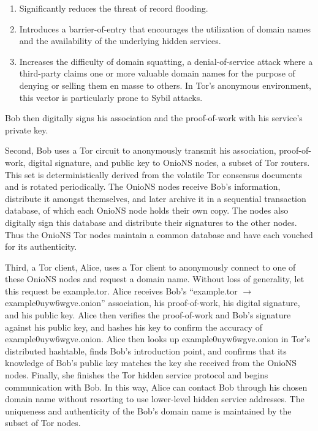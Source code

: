 \documentclass{sig-alternate}
\begin{document}
\begin{enumerate}
	\item Significantly reduces the threat of record flooding.
	\item Introduces a barrier-of-entry that encourages the utilization of domain names and the availability of the underlying hidden services.
	\item Increases the difficulty of domain squatting, a denial-of-service attack where a third-party claims one or more valuable domain names for the purpose of denying or selling them en masse to others. In Tor's anonymous environment, this vector is particularly prone to Sybil attacks.
\end{enumerate}

Bob then digitally signs his association and the proof-of-work with his service's private key.

Second, Bob uses a Tor circuit to anonymously transmit his association, proof-of-work, digital signature, and public key to OnioNS nodes, a subset of Tor routers. This set is deterministically derived from the volatile Tor consensus documents and is rotated periodically. The OnioNS nodes receive Bob's information, distribute it amongst themselves, and later archive it in a sequential transaction database, of which each OnioNS node holds their own copy. The nodes also digitally sign this database and distribute their signatures to the other nodes. Thus the OnioNS Tor nodes maintain a common database and have each vouched for its authenticity.

Third, a Tor client, Alice, uses a Tor client to anonymously connect to one of these OnioNS nodes and request a domain name. Without loss of generality, let this request be example.tor. Alice receives Bob's ``example.tor $ \rightarrow $ example0uyw6wgve.onion'' association, his proof-of-work, his digital signature, and his public key. Alice then verifies the proof-of-work and Bob's signature against his public key, and hashes his key to confirm the accuracy of example0uyw6wgve.onion. Alice then looks up example0uyw6wgve.onion in Tor's distributed hashtable, finds Bob's introduction point, and confirms that its knowledge of Bob's public key matches the key she received from the OnioNS nodes. Finally, she finishes the Tor hidden service protocol and begins communication with Bob. In this way, Alice can contact Bob through his chosen domain name without resorting to use lower-level hidden service addresses. The uniqueness and authenticity of the Bob's domain name is maintained by the subset of Tor nodes.
\end{document}
